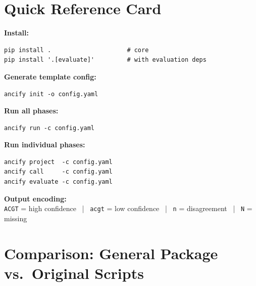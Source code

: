 \documentclass[11pt,a4paper]{article}
\begin{document}
\appendix
\section{Quick Reference Card}
\label{app:quickref}

\begin{tcolorbox}[colback=lightblue, colframe=accentblue,
    title={\bfseries Pipeline Quick Reference}]

\textbf{Install:}
\begin{lstlisting}[style=bashstyle, backgroundcolor=\color{white}]
pip install .                     # core
pip install '.[evaluate]'         # with evaluation deps
\end{lstlisting}

\textbf{Generate template config:}
\begin{lstlisting}[style=bashstyle, backgroundcolor=\color{white}]
ancify init -o config.yaml
\end{lstlisting}

\textbf{Run all phases:}
\begin{lstlisting}[style=bashstyle, backgroundcolor=\color{white}]
ancify run -c config.yaml
\end{lstlisting}

\textbf{Run individual phases:}
\begin{lstlisting}[style=bashstyle, backgroundcolor=\color{white}]
ancify project  -c config.yaml
ancify call     -c config.yaml
ancify evaluate -c config.yaml
\end{lstlisting}

\textbf{Output encoding:}\\
\texttt{ACGT} = high confidence ~|~
\texttt{acgt} = low confidence ~|~
\texttt{n} = disagreement ~|~
\texttt{N} = missing

\end{tcolorbox}


\section{Comparison: General Package vs.\ Original Scripts}
\label{app:comparison}
\end{document}
